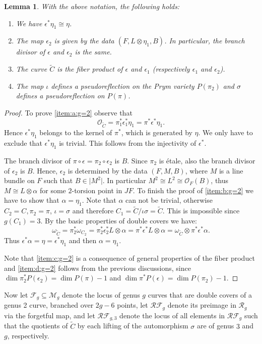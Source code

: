 \documentclass[preprint,12pt]{amsart}
\def\cF{\ensuremath{\mathcal{F}}}
\def\cO{\ensuremath{\mathcal{O}}}
\def\cR{\ensuremath{\mathcal{R}}}
\def\tC{\ensuremath{\tilde{C}}}
\theoremstyle{plain}
\newtheorem{lemma}[lemma]{Lemma}
\theoremstyle{definition}
\begin{document}
\begin{lemma}\label{lemma_g=2}
 With the above notation, the following holds:
 \begin{enumerate}
 \item\label{item:a:g=2} We have $\epsilon^* \eta_1\cong \eta$.
 \item\label{item:b:g=2} The map $\epsilon_2$ is given by the data $(F, L\otimes \eta_1,B)$.
 In particular, the branch divisor of $\epsilon$ and $\epsilon_2$ is the same.
 \item\label{item:c:g=2} The curve $\tC$ is the fiber product of $\epsilon$ and $\epsilon_1 $ (respectively $\epsilon_1$ and $\epsilon_2$).
 \item\label{item:d:g=2} The map $\iota $ defines a pseudoreflection on the Prym variety $P(\pi_2)$ and $\sigma $ defines a pseudoreflection on $P(\pi)$.
 \end{enumerate}
\end{lemma}
\begin{proof}
To prove \eqref{item:a:g=2} observe that 
\[\cO_{\tC}=\pi_1^*\epsilon_1 ^*\eta_1=\pi^* \epsilon ^* \eta_1 .\]
Hence $\epsilon^* \eta_1$ belongs to the kernel of $\pi^*$, which is generated by $\eta$. We only have to exclude that $\epsilon^* \eta_1 $ is trivial.
This follows from the injectivity of $\epsilon ^*$.

The branch divisor of $\pi \circ \epsilon =\pi_2\circ \epsilon_2$ is $B$. Since $\pi_2 $ is \'etale, also the branch divisor of $\epsilon_2$ is $B$. Hence, $\epsilon_2$ is determined by the data $(F,M,B)$, where $M$ is a line bundle on $F$ such that $B\in \vert M^2\vert$. In particular $M^2\cong L^2\cong \cO_F(B)$, thus $M\cong L\otimes \alpha $ for some $2$-torsion point in $JF$. To finish the proof of \eqref{item:b:g=2} we have to show that $\alpha = \eta_1 $. Note that $\alpha $ can not be trivial, otherwise $C_2=C, \pi_2 = \pi $, $\iota = \sigma $ and therefore $C_1 = \tC /\iota \sigma =\tC $. This is impossible since $g(C_1)=3$. By the basic properties of double covers we have:
$$
\omega_{\tC}=\pi_2^* \omega_{C_2} =\pi_2^* \epsilon_2^* L\otimes \alpha =
\pi^* \epsilon^* L\otimes \alpha = \omega_{\tC}\otimes \pi^* \epsilon ^* \alpha.
$$
Thus $\epsilon^* \alpha =\eta=\epsilon^* \eta_1 $ and then $\alpha=\eta_1$.

Note that \eqref{item:c:g=2} is a consequence of general properties of the fiber product and \eqref{item:d:g=2} follows from the previous discussions, since $\dim \pi_2^*P(\epsilon_2)=\dim P(\pi)-1$ and $\dim \pi^*P(\epsilon)=\dim P(\pi_2)-1$. 
\end{proof}
Now let $\cF_g\subseteq\mathcal{M}_g$ denote the locus of genus $g$ curves that are double covers of a genus 2 curve, branched over $2g-6$ points, let $\cR\cF_{g}$ denote its preimage in $\cR_g$ via the forgetful map, and let $\cR\cF_{g,3}$ denote the locus of all elements in $\cR\cF_g$ such that the quotients of $\tC$ by each lifting of the automorphism $\sigma$ are of genus $3$ and $g$, respectively.
\end{document}
